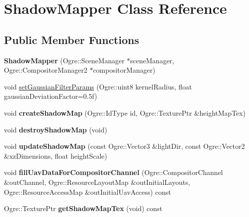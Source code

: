 \hypertarget{class_shadow_mapper}{}\section{Shadow\+Mapper Class Reference}
\label{class_shadow_mapper}
\subsection*{Public Member Functions}
\begin{DoxyCompactItemize}
\item 
\mbox{\label{class_shadow_mapper_a83504b2db6dc914c993011d388d3c139}} 
{\bfseries Shadow\+Mapper} (Ogre\+::\+Scene\+Manager $\ast$scene\+Manager, Ogre\+::\+Compositor\+Manager2 $\ast$compositor\+Manager)
\item 
void \hyperlink{class_shadow_mapper_a5438f906adc558347171a1d4fbbe616d}{set\+Gaussian\+Filter\+Params} (Ogre\+::uint8 kernel\+Radius, float gaussian\+Deviation\+Factor=0.\+5f)
\item 
\mbox{\label{class_shadow_mapper_a05511961c2261cd32eacf534bf0873a8}} 
void {\bfseries create\+Shadow\+Map} (Ogre\+::\+Id\+Type id, Ogre\+::\+Texture\+Ptr \&height\+Map\+Tex)
\item 
\mbox{\label{class_shadow_mapper_aaa7a869e868690bf241b83d9bcb8626d}} 
void {\bfseries destroy\+Shadow\+Map} (void)
\item 
\mbox{\label{class_shadow_mapper_afa29619eed1b51a4088bbfbd64cf1a1a}} 
void {\bfseries update\+Shadow\+Map} (const Ogre\+::\+Vector3 \&light\+Dir, const Ogre\+::\+Vector2 \&xz\+Dimensions, float height\+Scale)
\item 
\mbox{\label{class_shadow_mapper_a993ea2a8424fc5b966bac231b14c5353}} 
void {\bfseries fill\+Uav\+Data\+For\+Compositor\+Channel} (Ogre\+::\+Compositor\+Channel \&out\+Channel, Ogre\+::\+Resource\+Layout\+Map \&out\+Initial\+Layouts, Ogre\+::\+Resource\+Access\+Map \&out\+Initial\+Uav\+Access) const
\item 
\mbox{\label{class_shadow_mapper_a624f59c26a8831b0e3bbabb82ef9a822}} 
Ogre\+::\+Texture\+Ptr {\bfseries get\+Shadow\+Map\+Tex} (void) const
\end{DoxyCompactItemize}
